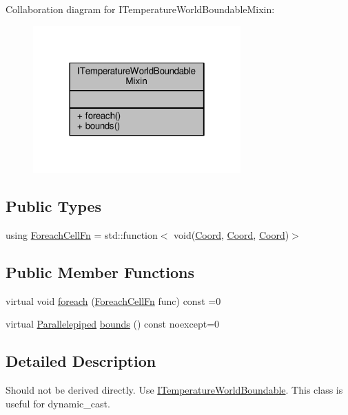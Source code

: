 Collaboration diagram for I\-Temperature\-World\-Boundable\-Mixin\-:
\nopagebreak
\begin{figure}[H]
\begin{center}
\leavevmode
\includegraphics[width=226pt]{class_i_temperature_world_boundable_mixin__coll__graph}
\end{center}
\end{figure}
\subsection*{Public Types}
\begin{DoxyCompactItemize}
\item 
using \hyperlink{class_i_temperature_world_boundable_mixin_a370c20d79642d15e97843da972d87ba9}{Foreach\-Cell\-Fn} = std\-::function$<$ void(\hyperlink{struct_coord}{Coord}, \hyperlink{struct_coord}{Coord}, \hyperlink{struct_coord}{Coord})$>$
\end{DoxyCompactItemize}
\subsection*{Public Member Functions}
\begin{DoxyCompactItemize}
\item 
virtual void \hyperlink{class_i_temperature_world_boundable_mixin_ac350b2e2ea22a229e6543d55e3217317}{foreach} (\hyperlink{class_i_temperature_world_boundable_mixin_a370c20d79642d15e97843da972d87ba9}{Foreach\-Cell\-Fn} func) const =0
\item 
virtual \hyperlink{struct_parallelepiped}{Parallelepiped} \hyperlink{class_i_temperature_world_boundable_mixin_a4811acd7f2bade56752c6326b0860f0c}{bounds} () const noexcept=0
\end{DoxyCompactItemize}


\subsection{Detailed Description}
Should not be derived directly. Use {\ttfamily \hyperlink{class_i_temperature_world_boundable}{I\-Temperature\-World\-Boundable}}. This class is useful for {\ttfamily dynamic\-\_\-cast}. 


